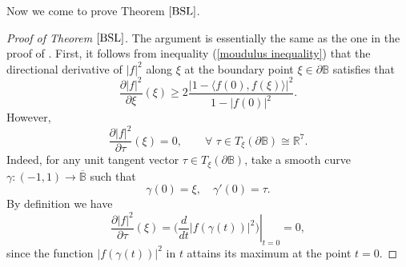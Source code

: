 \documentclass{amsart}
\theoremstyle{definition}
\theoremstyle{remark}
\numberwithin{equation}{section}
\begin{document}
Now we come to prove Theorem $\ref{BSL}$.

\begin{proof}[Proof of Theorem $\ref{BSL}$]
The argument is essentially the same as the one in the proof of \cite[Theorem 2.4]{WR}.
First, it follows from inequality  (\ref{moudulus inequality}) that the directional derivative of $|f|^2$ along $\xi$ at the boundary point $\xi\in\partial\mathbb B$ satisfies that
\begin{equation}\label{radial der}
\frac{\partial |f|^2}{\partial \xi}(\xi)\geq 2\frac{\big|1-\big\langle f(0), f(\xi)\big\rangle\big|^2}{1-|f(0)|^2}.
\end{equation}
However,
\begin{equation}\label{tangent der}
\frac{\partial |f|^2}{\partial \tau}(\xi)=0, \qquad \forall\, \,\tau\in T_{\xi}(\partial \mathbb B)\cong \mathbb R^7.
\end{equation}
Indeed, for any unit tangent vector $\tau\in T_{\xi}(\partial \mathbb B)$, take a smooth curve
$\gamma:(-1,1)\rightarrow\overline{\mathbb B}$ such that
$$\gamma(0)=\xi,\quad \gamma'(0)=\tau.$$
By definition we have
$$\frac{\partial |f|^2}{\partial \tau}(\xi)=\left.\bigg(\frac{d}{dt}\big|f(\gamma(t))\big|^2\bigg)\right|_{t=0}=0,$$
since the function $|f(\gamma(t))\big|^2$ in $t$ attains its maximum at the point $t=0$.


\end{proof}
\end{document}

